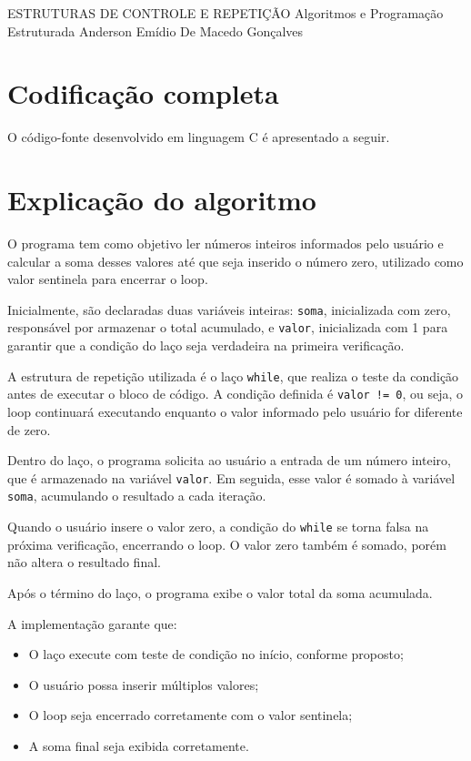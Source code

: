 \documentclass[12pt,a4paper]{article}
\begin{document}
\montarinicio
    {ESTRUTURAS DE CONTROLE E REPETIÇÃO}
    {Algoritmos e Programação Estruturada}
    {Anderson Emídio De Macedo Gonçalves}

\section{Codificação completa}

O código-fonte desenvolvido em linguagem C é apresentado a seguir.

\lstset{language=C}



\newpage

\section{Explicação do algoritmo}

O programa tem como objetivo ler números inteiros informados pelo usuário e calcular a soma desses valores até que seja inserido o número zero, utilizado como valor sentinela para encerrar o loop.

Inicialmente, são declaradas duas variáveis inteiras: \texttt{soma}, inicializada com zero, responsável por armazenar o total acumulado, e \texttt{valor}, inicializada com 1 para garantir que a condição do laço seja verdadeira na primeira verificação.

A estrutura de repetição utilizada é o laço \texttt{while}, que realiza o teste da condição antes de executar o bloco de código. A condição definida é \texttt{valor != 0}, ou seja, o loop continuará executando enquanto o valor informado pelo usuário for diferente de zero.

Dentro do laço, o programa solicita ao usuário a entrada de um número inteiro, que é armazenado na variável \texttt{valor}. Em seguida, esse valor é somado à variável \texttt{soma}, acumulando o resultado a cada iteração.

Quando o usuário insere o valor zero, a condição do \texttt{while} se torna falsa na próxima verificação, encerrando o loop. O valor zero também é somado, porém não altera o resultado final.

Após o término do laço, o programa exibe o valor total da soma acumulada.

A implementação garante que:
\begin{itemize}
    \item O laço execute com teste de condição no início, conforme proposto;
    \item O usuário possa inserir múltiplos valores;
    \item O loop seja encerrado corretamente com o valor sentinela;
    \item A soma final seja exibida corretamente.
\end{itemize}
\end{document}
